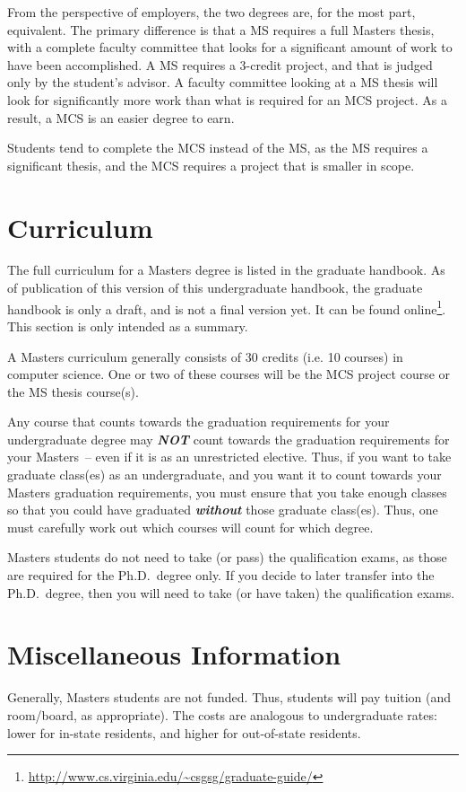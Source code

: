 \documentclass[10pt,letter]{book}
\newcommand{\mysection}[1]{\section{#1}\renewcommand{\rightmark}{#1}}
\newcommand{\myurl}[1]{\footnote{\scriptsize\url{#1}}}
\begin{document}
From the perspective of employers, the two degrees are, for the most part,
equivalent.  The primary difference is that a MS requires a full
Masters thesis, with a complete faculty committee that looks for a
significant amount of work to have been accomplished.  A MS requires a
3-credit project, and that is judged only by the student's advisor.  A
faculty committee looking at a MS thesis will look for significantly
more work than what is required for an MCS project.  As a result, a
MCS is an easier degree to earn.

Students tend to complete the MCS instead of the MS, as the MS
requires a significant thesis, and the MCS requires a project that is
smaller in scope.


\mysection{Curriculum}

The full curriculum for a Masters degree is listed in the graduate
handbook.  As of publication of this version of this undergraduate
handbook, the graduate handbook is only a draft, and is not a final
version yet.  It can be found
online\myurl{http://www.cs.virginia.edu/~csgsg/graduate-guide/}. This
section is only intended as a summary.

A Masters curriculum generally consists of 30 credits (i.e. 10
courses) in computer science.  One or two of these courses will be the
MCS project course or the MS thesis course(s).

Any course that counts towards the graduation requirements for your
undergraduate degree may {\em\bf NOT} count towards the graduation
requirements for your Masters~-- even if it is as an unrestricted
elective.  Thus, if you want to take graduate class(es) as an
undergraduate, and you want it to count towards your Masters
graduation requirements, you must ensure that you take enough classes
so that you could have graduated {\em\bf without} those graduate
class(es).  Thus, one must carefully work out which courses will count
for which degree.

Masters students do not need to take (or pass) the qualification
exams, as those are required for the Ph.D.\ degree only.  If you
decide to later transfer into the Ph.D.\ degree, then you will need to
take (or have taken) the qualification exams.

\mysection{Miscellaneous Information}

Generally, Masters students are not funded.  Thus, students will pay
tuition (and room/board, as appropriate).  The costs are analogous to
undergraduate rates: lower for in-state residents, and higher for
out-of-state residents.
\end{document}
